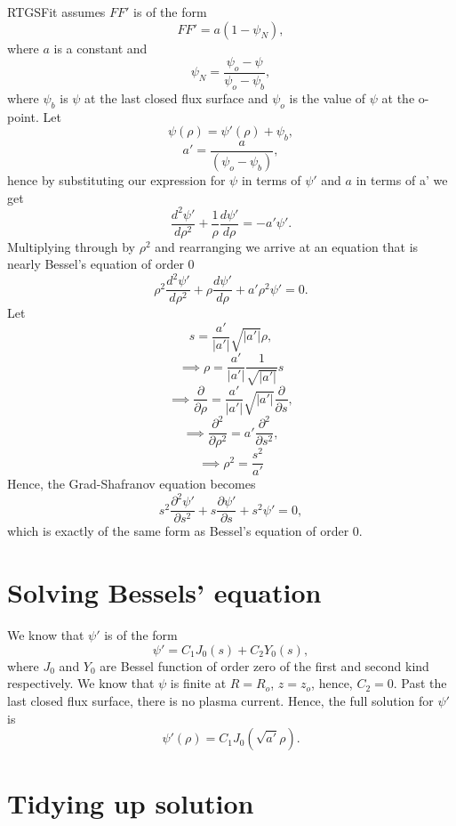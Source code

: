 \documentclass{article}
\begin{document}
RTGSFit assumes $FF'$ is of the form
\[FF' = a(1-\psi_N),\]
where $a$ is a constant and
\[\psi_N = \frac{\psi_o-\psi}{\psi_o-\psi_b},\]
where $\psi_b$ is $\psi$ at the last closed flux surface and $\psi_o$ is the value of $\psi$ at the o-point.
Let
\[\psi(\rho)=\psi'(\rho)+\psi_b,\]
\[a'=\frac{a}{(\psi_o - \psi_b)},\]
hence by substituting our expression for $\psi$ in terms of $\psi'$ and $a$ in terms of a' we get
\[\frac{d^2\psi'}{d \rho^2} + \frac{1}{\rho}\frac{d \psi'}{d \rho} = -a'\psi'.\]
Multiplying through by $\rho^2$ and rearranging we arrive at an equation that is nearly Bessel's equation of order 0
\[\rho^2\frac{d^2\psi'}{d \rho^2} + \rho\frac{d \psi'}{d \rho} + a'\rho^2\psi'= 0.\]
Let 
\[s=\frac{a'}{|a'|}\sqrt{|a'|}\rho,\]
\[\implies \rho=\frac{a'}{|a'|}\frac{1}{\sqrt{|a'|}}s\]
\[\implies \frac{\partial }{\partial \rho} =\frac{a'}{|a'|}\sqrt{|a'|}\frac{\partial }{\partial s},\]
\[\implies \frac{\partial^2 }{\partial \rho^2} =a'\frac{\partial^2 }{\partial s^2},\]
\[\implies \rho^2 = \frac{s^2}{a'}\]
Hence, the Grad-Shafranov equation becomes
\[s^2\frac{\partial^2\psi'}{\partial s^2} + s\frac{\partial \psi'}{\partial s} + s^2\psi'= 0,\]
which is exactly of the same form as Bessel's equation of order 0.

\section{Solving Bessels' equation}

We know that $\psi'$ is of the form
\[\psi' = C_1J_0(s) + C_2Y_0(s),\]
where $J_0$ and $Y_0$ are Bessel function of order zero of the first and second kind respectively. We know that $\psi$ is finite at $R=R_o$, $z=z_o$, hence, $C_2=0$.
Past the last closed flux surface, there is no plasma current. 
Hence, the full solution for $\psi'$ is
\[\psi'(\rho) = C_1J_0(\sqrt{a'}\rho).\]

\section{Tidying up solution}
\end{document}
